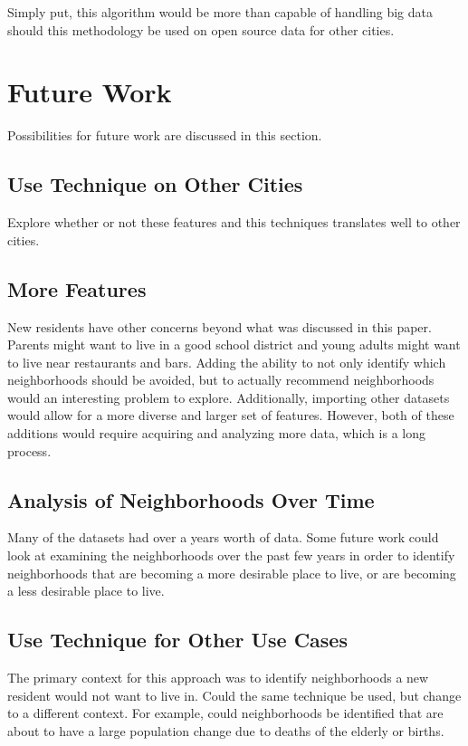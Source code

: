 \documentclass[conference]{IEEEtran}
\begin{document}
Simply put, this algorithm would be more than capable of handling big data should this methodology be used on open
source data for other cities.

\section{Future Work}
Possibilities for future work are discussed in this section.
\subsection{Use Technique on Other Cities}
Explore whether or not these features and this techniques translates well to other cities.
 \subsection{More Features}
 New residents have other concerns beyond what was discussed in this paper.  Parents might want to live in a good school
 district and young adults might want to live near restaurants and bars.  Adding the ability to not only identify which
 neighborhoods should be avoided, but to actually recommend neighborhoods would an interesting problem to explore.
 Additionally, importing other datasets would allow for a more diverse and larger set of features.
 However, both of these additions would require acquiring and analyzing more data, which is a long process.
 \subsection{Analysis of Neighborhoods Over Time}
 Many of the datasets had over a years worth of data.  Some future work could look at examining the neighborhoods over
 the past few years in order to identify neighborhoods that are becoming a more desirable place to live, or are becoming
 a less desirable place to live.
 \subsection{Use Technique for Other Use Cases}
 The primary context for this approach was to identify neighborhoods a new resident would not want to live in.  Could
 the same technique be used, but change to a different context.  For example, could neighborhoods be identified that
 are about to have a large population change due to deaths of the elderly or births.
\end{document}
